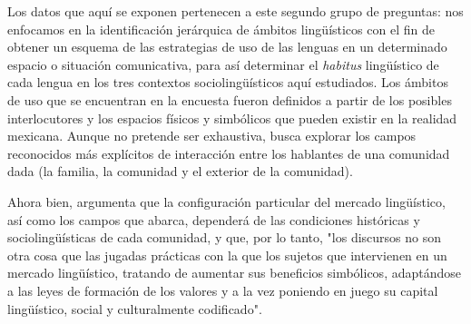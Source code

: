 \documentclass[output=paper]{../langscibook}
\begin{document}
\begin{table}
\end{table}

Los datos que aquí se exponen pertenecen a este segundo grupo de preguntas: nos enfocamos en la identificación jerárquica de ámbitos lingüísticos con el fin de obtener un esquema de las estrategias de uso de las lenguas en un determinado espacio o situación comunicativa, para así determinar el \textit{habitus} lingüístico de cada lengua en los tres contextos sociolingüísticos aquí estudiados. Los ámbitos de uso que se encuentran en la encuesta fueron definidos a partir de los posibles interlocutores y los espacios físicos y simbólicos que pueden existir en la realidad mexicana. Aunque no pretende ser exhaustiva, busca explorar los campos reconocidos más explícitos de interacción entre los hablantes de una comunidad dada (la familia, la comunidad y el exterior de la comunidad).

Ahora bien,  \citet[2, 217]{AlonsoBenito2004} argumenta que la configuración particular del mercado lingüístico, así como los campos que abarca, dependerá de las condiciones históricas y sociolingüísticas de cada comunidad, y que, por lo tanto, "los discursos no son otra cosa que las jugadas prácticas con la que los sujetos que intervienen en un mercado lingüístico, tratando de aumentar sus beneficios simbólicos, adaptándose a las leyes de formación de los valores y a la vez poniendo en juego su capital lingüístico, social y culturalmente codificado".
\end{document}

